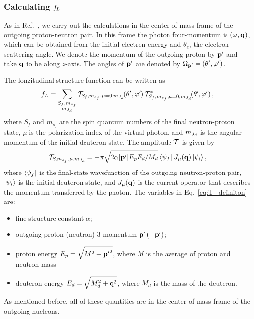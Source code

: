 	\medskip

	\subsubsection{Calculating $f_L$}

	As in Ref.~\cite{Yang:2013rza}, we carry out the calculations in
	the center-of-mass frame of the outgoing proton-neutron pair.
	In this frame the photon
	four-momentum is $(\omega,\mathbf{q})$, which can be obtained from the
	initial electron energy and $\theta_e$, the electron scattering angle.
	We denote the momentum of the outgoing proton by $\mathbf{p^\prime}$ and
	take $\mathbf{q}$ to be along $z$-axis.  The angles of $\mathbf{p^\prime}$ are
	denoted by $\Omega_{\mathbf{p^\prime}} = (\theta^{\prime}, \varphi^{\prime})$.

	The longitudinal structure function can be written as
	\begin{equation}
	 f_L = \sum_{\substack{S_f, m_{s_f}\\ m_{J_d}}}
	 \mathcal{T}_{S_f,m_{s_f},\mu = 0,m_{J_d}}\!(\theta^{\prime}, \varphi^{\prime}) \,
	 \mathcal{T}_{S_f, m_{s_f},\mu = 0,m_{J_d}}^\ast\!(\theta^{\prime}, \varphi^{\prime}) \,,
	\label{eq:f_L_from_T}
	\end{equation}
	where $S_f$ and $m_{s_f}$ are the spin quantum numbers of the final
	neutron-proton state, $\mu$ is the polarization index of the virtual photon,
	and $m_{J_d}$ is the angular momentum of the initial deuteron
	state. The amplitude $\mathcal{T}$ is given by~\cite{Arenhoevel:1992xu}
	\begin{equation}
	 \mathcal{T}_{S,m_{s_f},\mu,m_{J_d}}
	 = -\pi \sqrt{2\alpha|\mathbf{p^\prime}|E_p E_d / M_d}
	 \,\langle \psi_{f} \,|\, J_{\mu}(\mathbf{q}) \,| \psi_i \rangle \,,
	\label{eq:T_definiton}
	\end{equation}
	where ${\langle\psi_f|}$ is the final-state wavefunction of the outgoing
	neutron-proton pair, ${|\psi_i\rangle}$ is the initial deuteron state, and
	$J_{\mu} (\mathbf{q})$ is the current operator that describes the momentum
	transferred by the photon.
	The variables in Eq.~\eqref{eq:T_definiton} are:
	\begin{itemize}
	\item fine-structure constant $\alpha$;
	\item outgoing proton (neutron) 3-momentum $\mathbf{p^\prime} \, (-\mathbf{p^\prime})$;
	\item proton energy $\displaystyle E_p = \sqrt{M^2 + \mathbf{p^\prime}^2}$,
	where $M$ is the average of proton and neutron mass
	\item deuteron energy $\displaystyle E_d = \sqrt{M_d^2 + \mathbf{q}^2} $,
	where $M_d$ is the mass of the deuteron.
	\end{itemize}
	As mentioned before, all of these quantities are in the center-of-mass
	frame of the outgoing nucleons.

